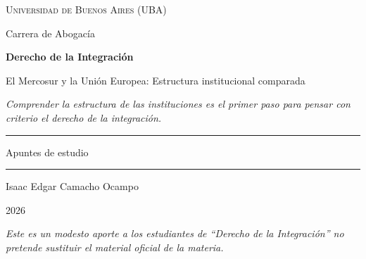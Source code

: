 \documentclass[12pt,oneside]{book}
\newcommand{\universidad}{Universidad de Buenos Aires (UBA)}
\newcommand{\carrera}{Carrera de Abogacía}
\newcommand{\materia}{Derecho de la Integración}
\newcommand{\titulo}{El Mercosur y la Unión Europea: Estructura institucional comparada}
\newcommand{\autor}{Isaac Edgar Camacho Ocampo}
\newcommand{\anio}{2026}
\begin{document}
\begin{titlepage}

\thispagestyle{empty}

\begin{center}

\vspace*{1cm}

{\large \textsc{\universidad}}

\vspace{0.2cm}

{\large \carrera}

\vspace{3cm}

{\Huge \textbf{\materia}}

\vspace{1cm}

{\LARGE \titulo}

\vspace{0.8cm}

\textit{Comprender la estructura de las instituciones es el primer paso para pensar con criterio el derecho de la integración.}

\vspace{1.2cm}

\rule{0.70\textwidth}{0.5pt}

\vspace{0.5cm}

{\large Apuntes de estudio}

\vspace{0.5cm}

\rule{0.70\textwidth}{0.5pt}

\vfill

{\large \autor}

\vspace{0.3cm}

{\large \anio}

\end{center}

\vfill

\begin{flushleft}
\textit{Este es un modesto aporte a los estudiantes de ``\materia'' no pretende sustituir el material oficial de la materia.}
\end{flushleft}

\end{titlepage}

\tableofcontents
\end{document}
